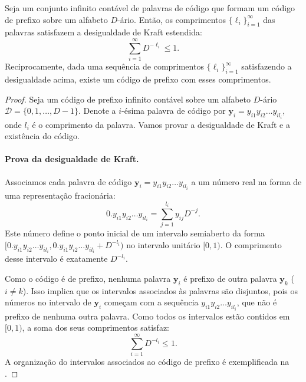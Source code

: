 \begin{theorem}\label{thm:kraftinfinito}
Seja um conjunto infinito contável de palavras de código que formam um código
de prefixo sobre um alfabeto $D$-ário. Então, os comprimentos
$\{\ell_i\}_{i=1}^\infty$ das palavras satisfazem a desigualdade de Kraft
estendida:
\begin{equation}
\sum_{i=1}^\infty D^{-\ell_i} \leq 1.
\end{equation}
Reciprocamente, dada uma sequência de comprimentos $\{\ell_i\}_{i=1}^\infty$
satisfazendo a desigualdade acima, existe um código de prefixo com esses
comprimentos.
\end{theorem}

\begin{proof}
Seja um código de prefixo infinito contável sobre um alfabeto $D$-ário
$\mathcal{D} = \{0, 1, \dots, D-1\}$. Denote a $i$-ésima palavra de código
por $\mathbf{y}_i = y_{i1} y_{i2} \dots y_{il_i}$, onde $l_i$ é o
comprimento da palavra. Vamos provar a desigualdade de Kraft e a existência
do código.

\paragraph{Prova da desigualdade de Kraft.}
Associamos cada palavra de código $\mathbf{y}_i = y_{i1} y_{i2} \dots y_{il_i}$
a um número real na forma de uma representação fracionária:
\begin{equation}
0.y_{i1} y_{i2} \dots y_{il_i} = \sum_{j=1}^{l_i} y_{ij} D^{-j}.
\end{equation}
Este número define o ponto inicial de um intervalo semiaberto da forma
$[0.y_{i1} y_{i2} \dots y_{il_i}, 0.y_{i1} y_{i2} \dots y_{il_i} + D^{-l_i})$
no intervalo unitário $[0,1)$. O comprimento desse intervalo é exatamente $D^{-l_i}$.

Como o código é de prefixo, nenhuma palavra $\mathbf{y}_i$ é prefixo de outra
palavra $\mathbf{y}_k$ ($i \neq k$). Isso implica que os intervalos
associados às palavras são disjuntos, pois os números no intervalo de
$\mathbf{y}_i$ começam com a sequência $y_{i1} y_{i2} \dots y_{il_i}$, que
não é prefixo de nenhuma outra palavra. Como todos os intervalos estão
contidos em $[0,1)$, a soma dos seus comprimentos satisfaz:
\begin{equation}
\sum_{i=1}^\infty D^{-l_i} \leq 1.
\end{equation}
A organização do intervalos associados ao código de prefixo é exemplificada
na .


\end{proof}
